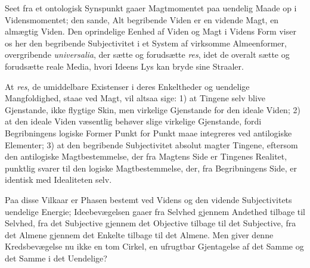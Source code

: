 \documentclass[11pt]{book}
\newcommand{\opage}[1]{\marginnote{\footnotesize\textit{[#1]}}}
\begin{document}
Seet fra et ontologisk Synspunkt gaaer Magtmomentet paa uendelig Maade
op i Vidensmomentet; den sande, Alt begribende Viden er en vidende
Magt, en almægtig Viden. Den oprindelige Eenhed af Viden og Magt i
Videns Form viser os her den begribende Subjectivitet i et System af
virksomme Almeenformer, overgribende \textit{universalia}, der sætte og
forudsætte \textit{res}, idet de overalt sætte og forudsætte reale
Media, hvori Ideens Lys kan bryde sine Straaler.

\opage{191} \setcounter{footnote}{0}%
At \textit{res}, de umiddelbare Existenser i deres Enkeltheder og
uendelige Mangfoldighed, staae ved Magt, vil altsaa sige: 1) at
Tingene selv blive Gjenstande, ikke flygtige Skin, men virkelige
Gjenstande for den ideale Viden; 2) at den ideale Viden væsentlig
behøver slige virkelige Gjenstande, fordi Begribningens logiske Former
Punkt for Punkt maae integreres ved antilogiske Elementer; 3) at den
begribende Subjectivitet absolut magter Tingene, eftersom den
antilogiske Magtbestemmelse, der fra Magtens Side er Tingenes Realitet,
punktlig svarer til den logiske Magtbestemmelse, der, fra Begribningens
Side, er identisk med Idealiteten selv.

Paa disse Vilkaar er Phasen bestemt ved Videns og den vidende
Subjectivitets uendelige Energie; Ideebevægelsen gaaer fra Selvhed
gjennem Andethed tilbage til Selvhed, fra det Subjective gjennem det
Objective tilbage til det Subjective, fra det Almene gjennem det
Enkelte tilbage til det Almene. Men giver denne Kredsbevægelse nu ikke
en tom Cirkel, en ufrugtbar Gjentagelse af det Samme og det Samme i det
Uendelige?
\end{document}
